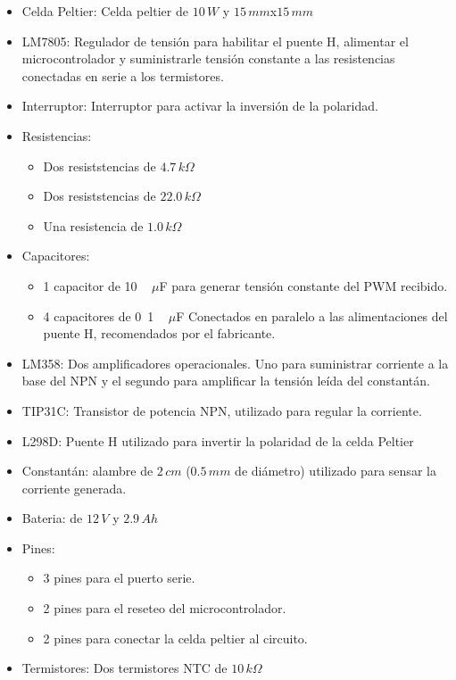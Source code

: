 \documentclass[10pt,spanish,a4paper,openany,notitlepage]{article}
\begin{document}
\begin{itemize}
\item{Celda Peltier:} Celda peltier de $10\, \unit{W}$ y $15\, \unit{mm}$x$15\,\unit{mm}$ 
\item{LM7805:} Regulador de tensión para habilitar el puente H, alimentar
el microcontrolador y suministrarle tensión constante a las resistencias conectadas
en serie a los termistores.
\item{Interruptor:} Interruptor para activar la inversión de la polaridad.
\item{Resistencias:}
	\begin{itemize}
	\item Dos resiststencias de $4.7\,\unit{k\Omega}$
	\item Dos resiststencias de $22.0\,\unit{k\Omega}$
	\item Una resistencia de $1.0\,\unit{k\Omega}$
	\end{itemize}
\item{Capacitores:} 
	\begin{itemize}
	\item 1 capacitor de \unit{10\, \unit{$\mu$F}} para generar
	tensión constante del PWM recibido.
	\item 4 capacitores de \unit{0.1\, \unit{$\mu$F}} Conectados en paralelo
	a las alimentaciones del puente H, recomendados por el fabricante. 
	\end{itemize}
\item{LM358:} Dos amplificadores operacionales. Uno para suministrar corriente
a la base del NPN y el segundo para amplificar la tensión leída del constantán. 
\item{TIP31C:} Transistor de potencia NPN, utilizado para regular la corriente.
\item{L298D:} Puente H utilizado para invertir la polaridad de la celda Peltier
\item{Constantán:} alambre de $2\, \unit{cm}$ ($0.5\, \unit{mm}$ de diámetro) utilizado para sensar la corriente generada.
\item{Bateria:} de $12\, \unit{V}$ y $2.9\, \unit{Ah}$
\item{Pines:}
	\begin{itemize}
	\item 3 pines para el puerto serie.
	\item 2 pines para el reseteo del microcontrolador.
	\item 2 pines para conectar la celda peltier al circuito.
	\end{itemize}
\item{Termistores:} Dos termistores NTC de $10\, \unit{k\Omega}$
\end{itemize}
\end{document}
